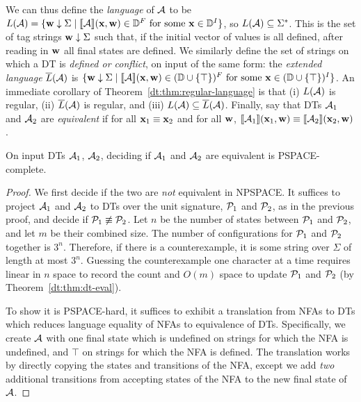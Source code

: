 We can thus define the \emph{language} of $\mathcal{A}$ to be $L(\mathcal{A}) = \{\mathbf{w} \downarrow \Sigma \mid \llbracket \mathcal{A} \rrbracket(\mathbf{x},\mathbf{w}) \in \mathbb{D}^F \text{ for some } \mathbf{x} \in \mathbb{D}^I\}$, so $L(\mathcal{A}) \subseteq \Sigma^*$. This is the set of tag strings $\mathbf{w} \downarrow \Sigma$ such that, if the initial vector of values is all defined, after reading in $\mathbf{w}$ all final states are defined.
We similarly define the set of strings on which a DT is \emph{defined or conflict}, on input of the same form: the \emph{extended language} $\overline{L}(\mathcal{A})$ is
$\{\mathbf{w} \downarrow \Sigma \mid \llbracket \mathcal{A} \rrbracket(\mathbf{x},\mathbf{w}) \in (\mathbb{D} \cup \{\top\})^F \text{ for some } \mathbf{x} \in (\mathbb{D} \cup \{\top\})^I\}$.
An immediate corollary of Theorem~\ref{dt:thm:regular-language} is that
(i) $L(\mathcal{A})$ is regular, (ii) $\overline{L}(\mathcal{A})$ is regular, and (iii) $L(\mathcal{A}) \subseteq \overline{L}(\mathcal{A})$.
Finally, say that DTs $\mathcal{A}_1$ and $\mathcal{A}_2$ are \emph{equivalent} if for all $\mathbf{x}_1 \equiv \mathbf{x}_2$ and
for all $\mathbf{w}$, $\llbracket \mathcal{A}_1 \rrbracket(\mathbf{x}_1,\mathbf{w}) \equiv \llbracket \mathcal{A}_2 \rrbracket(\mathbf{x}_2,\mathbf{w})$.

\begin{theorem}
\label{dt:thm:equivalence-pspace-complete}
On input DTs $\mathcal{A}_1$, $\mathcal{A}_2$,
deciding if $\mathcal{A}_1$ and $\mathcal{A}_2$ are equivalent is PSPACE-complete.
\end{theorem}
\begin{proof}
We first decide if the two are \emph{not} equivalent in NPSPACE.
It suffices to project $\mathcal{A}_1$ and $\mathcal{A}_2$ to DTs
over the unit signature, $\mathcal{P}_1$ and $\mathcal{P}_2$, as in the previous proof,
and decide if $\mathcal{P}_1 \not\equiv \mathcal{P}_2$.
Let $n$ be the number of states between $\mathcal{P}_1$ and $\mathcal{P}_2$,
and let $m$ be their combined size.
The number of configurations for $\mathcal{P}_1$ and $\mathcal{P}_2$ together is $3^n$.
Therefore, if there is a counterexample, it is some string over $\Sigma$ of length at most $3^n$.
Guessing the counterexample one character at a time
requires linear in $n$ space to record the count and $O(m)$ space to update
$\mathcal{P}_1$ and $\mathcal{P}_2$ (by Theorem~\ref{dt:thm:dt-eval}).

To show it is PSPACE-hard,
it suffices to exhibit a translation from NFAs to
DTs which reduces
language equality of NFAs to equivalence of DTs.
Specifically, we create $\mathcal{A}$ with one final state
which is undefined on strings for which the NFA is undefined, and $\top$
on strings for which the NFA is defined.
The translation works by directly copying the states and transitions of the NFA, except we add \emph{two} additional transitions from accepting states of the NFA to the new final state of $\mathcal{A}$.
\end{proof}

